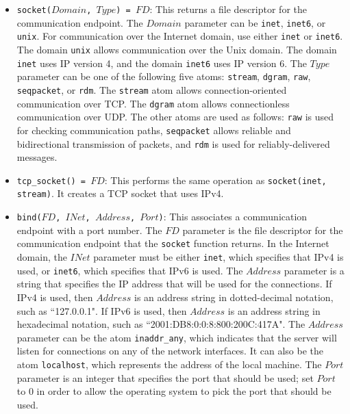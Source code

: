 \begin{itemize}
\item \texttt{socket($Domain$, $Type$) = $FD$}: This returns a file descriptor for the communication endpoint.  The $Domain$ parameter can be \texttt{inet}, \texttt{inet6}, or \texttt{unix}.  For communication over the Internet domain, use either \texttt{inet} or \texttt{inet6}.  The domain \texttt{unix} allows communication over the Unix domain.  The domain \texttt{inet} uses IP version 4, and the domain \texttt{inet6} uses IP version 6.  The $Type$ parameter can be one of the following five atoms: \texttt{stream}, \texttt{dgram}, \texttt{raw}, \texttt{seqpacket}, or \texttt{rdm}.  The \texttt{stream} atom allows connection-oriented communication over TCP.  The \texttt{dgram} atom allows connectionless communication over UDP.  The other atoms are used as follows: \texttt{raw} is used for checking communication paths, \texttt{seqpacket} allows reliable and bidirectional transmission of packets, and \texttt{rdm} is used for reliably-delivered messages.  
\item \texttt{tcp\_socket() = $FD$}: This performs the same operation as \texttt{socket(inet, stream)}.  It creates a TCP socket that uses IPv4.
\item \texttt{bind($FD$, $INet$, $Address$, $Port$)}: This associates a communication endpoint with a port number.  The $FD$ parameter is the file descriptor for the communication endpoint that the \texttt{socket} function returns.  In the Internet domain, the $INet$ parameter must be either \texttt{inet}, which specifies that IPv4 is used, or \texttt{inet6}, which specifies that IPv6 is used.  The $Address$ parameter is a string that specifies the IP address that will be used for the connections.  If IPv4 is used, then $Address$ is an address string in dotted-decimal notation, such as ``127.0.0.1".  If IPv6 is used, then $Address$ is an address string in hexadecimal notation, such as ``2001:DB8:0:0:8:800:200C:417A".  The $Address$ parameter can be the atom \texttt{inaddr\_any}, which indicates that the server will listen for connections on any of the network interfaces.  It can also be the atom \texttt{localhost}, which represents the address of the local machine.  The $Port$ parameter is an integer that specifies the port that should be used; set $Port$ to $0$ in order to allow the operating system to pick the port that should be used. 

\end{itemize}
